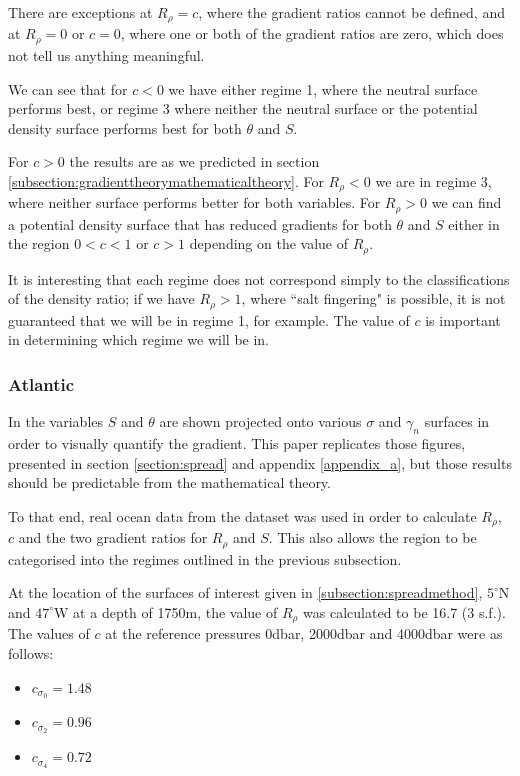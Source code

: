 There are exceptions at $R_\rho = c$, where the gradient ratios cannot be defined, and at $R_\rho = 0$ or $c = 0$, where one or both of the gradient ratios are zero, which does not tell us anything meaningful. 

We can see that for $c<0$ we have either regime 1, where the neutral surface performs best, or regime 3 where neither the neutral surface or the potential density surface performs best for both $\theta$ and $S$. 

For $c>0$ the results are as we predicted in section \ref{subsection:gradienttheorymathematicaltheory}. For $R_\rho<0$ we are in regime 3, where neither surface performs better for both variables. For $R_\rho>0$ we can find a potential density surface that has reduced gradients for both $\theta$ and $S$ either in the region $0<c<1$ or $c>1$ depending on the value of $R_\rho$. 

It is interesting that each regime does not correspond simply to the classifications of the density ratio; if we have $R_\rho>1$, where ``salt fingering" is possible, it is not guaranteed that we will be in regime 1, for example. The value of $c$ is important in determining which regime we will be in. 

\subsubsection{Atlantic}
\label{subsubsection:gradientresultsAtlantic}

In \citet{McDougall1987} the variables $S$ and $\theta$ are shown projected onto various $\sigma$ and $\gamma_n$ surfaces in order to visually quantify the gradient. This paper replicates those figures, presented in section \ref{section:spread} and appendix \ref{appendix_a}, but those results should be predictable from the mathematical theory. 

To that end, real ocean data from the \citet{WOCE2002} dataset was used in order to calculate $R_\rho$, $c$ and the two gradient ratios for $R_\rho$ and $S$. This also allows the region to be categorised into the regimes outlined in the previous subsection. 

At the location of the surfaces of interest given in \ref{subsection:spreadmethod},  $5^{\circ}$N and $47^{\circ}$W at a depth of 1750m, the value of $R_\rho$ was calculated to be 16.7 (3 s.f.). The values of $c$ at the reference pressures 0dbar, 2000dbar and 4000dbar were as follows:

\begin{itemize}
    \item $c_{\sigma_0} = 1.48$
    \item $c_{\sigma_2} = 0.96$
    \item $c_{\sigma_4} = 0.72$
\end{itemize}

